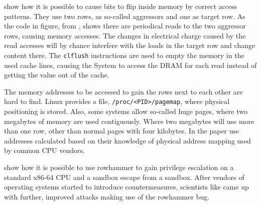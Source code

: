  show how it is possible to cause bits to flip inside
memory by correct access patterns. They use two rows, as so-called aggressors
and one as target row. As the code in figure, from
, shows there are periodical reads to the two aggressor
rows, causing memory accesses. The changes in electrical charge caused by the
read accesses will by chance interfere with the loads in the target row and
change content there. The \texttt{clflush} instructions are used to empty the
memory in the used cache lines, causing the System to access the DRAM for each
read instead of getting the value out of the cache.

The memory addresses to be accessed to gain the rows next to each other are hard
to find. Linux provides a file, \texttt{/proc/<PID>/pagemap}, where physical
positioning is stored. Also, some systems allow so-called huge pages, where two
megabytes of memory are used contiguously. Where two megabytes will use more
than one row, other than normal pages with four kilobytes. In the paper
 use addresses calculated based on their knowledge of
physical address mapping used by common CPU vendors.

 show how it is possible to use rowhammer to gain
privilege escalation on a standard x86-64 CPU and a sandbox escape from a
sandbox. After vendors of operating systems started to introduce
countermeasures, scientists like  came up with further, improved attacks making use of the rowhammer
bug.

